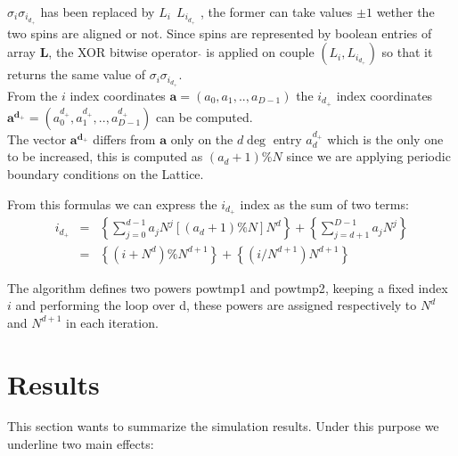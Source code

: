 \documentclass[11pt,a4paper]{article}
\begin{document}
$\sigma_i\sigma_{i_{d_+}}$ has been replaced by $L_i \ \hat{} \ L_{i_{d_+}}$ , the former can take values $\pm1$ wether the two spins are aligned or not. Since spins are represented by boolean entries of array $\mathbf{L}$, the XOR bitwise operator $\hat{}$ is applied on couple $(L_i,L_{i_{d_+}})$ so that it returns the same value of $\sigma_i\sigma_{i_{d_+}}$. \\
\vspace{0.1cm}
From the $i$ index coordinates $\mathbf{a} = (a_0,a_1,..,a_{D-1})$ the $i_{d_+}$ index coordinates
$\mathbf{a^{d_+}} = (a^{d_+}_0,a^{d_+}_1,..,a^{d_+}_{D-1})$ can be computed. \\
The vector $\mathbf{a^{d_+}}$ differs from $\mathbf{a}$
only on the $d\deg$ entry $a^{d_+}_d$ which is the only one to be increased, this is computed as $(a_d+1)\%N$ since we are applying periodic boundary conditions on the Lattice.

From this formulas we can express the $i_{d_+}$ index as the sum of two terms:
\begin{eqnarray*}
  i_{d_+} &=& \left\{ \sum_{j = 0}^{d-1}a_jN^j  [(a_d + 1)\%N]N^d \right\} + \left\{ \sum_{j = d+1}^{D-1}a_jN^j \right\}  \\
          &=& \left\{(i + N^d)\%N^{d+1} \right\}  +  \left\{ (i/N^{d+1})N^{d+1}  \right\}
\end{eqnarray*}

The algorithm defines two powers \textsf{pow\textunderscore tmp1} and \textsf{pow\textunderscore tmp2}, keeping a fixed index $i$ and performing the loop over d, these powers are assigned respectively to $N^d$ and $N^{d+1}$ in each iteration.

\newpage




%   












\newpage
\section{Results}
This section wants to summarize the simulation results. Under this purpose we underline two main effects:
\end{document}
